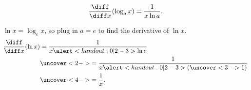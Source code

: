 \begin{frame}
\begin{theorem}
\[
\frac{\diff}{\diff x} (\log_a x) = \frac{1}{x\ln a} .
\]
\end{theorem}

$\ln x = \log_e x$, so plug in $a = e$ to find the derivative of $\ln x$.
\begin{align*}
\frac{\diff}{\diff x}(\ln x) & = \frac{1}{x\alert<handout:0| 2-3>{\ln e}} \\
 & \uncover<2->{= \frac{1}{x\alert<handout:0| 2-3>{(\uncover<3->{1})}}}\\
 & \uncover<4->{= \frac{1}{x}.}
\end{align*}
%
\end{frame}
